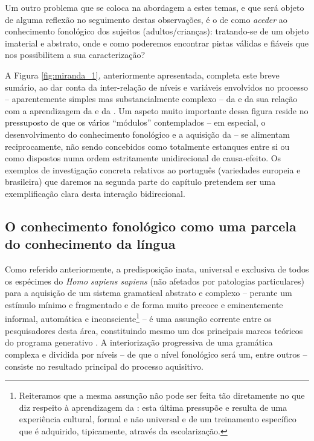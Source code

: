 \documentclass[output=paper]{LSP/langsci}
\begin{document}
Um outro problema que se coloca na abordagem a estes temas, e que será objeto de alguma reflexão no seguimento destas observações, é o de como \textit{aceder} ao conhecimento fonológico dos sujeitos (adultos/crianças): tratando-se de um objeto imaterial e abstrato, onde e como poderemos encontrar pistas válidas e fiáveis que nos possibilitem a sua caracterização?

A Figura \ref{fig:miranda_1}, anteriormente apresentada, completa este breve sumário, ao dar conta da inter-relação de níveis e variáveis envolvidos no processo -- aparentemente simples mas substancialmente complexo -- da  e da sua relação com a aprendizagem da  e da . Um aspeto muito importante dessa figura reside no pressuposto de que os vários ``módulos'' contemplados -- em especial, o desenvolvimento do conhecimento fonológico e a aquisição da  -- se alimentam reciprocamente, não sendo concebidos como totalmente estanques entre si ou como dispostos numa ordem estritamente unidirecional de causa-efeito. Os exemplos de investigação concreta relativos ao português (variedades europeia e brasileira) que daremos na segunda parte do capítulo pretendem ser uma exemplificação clara desta interação bidirecional.

\subsection{O conhecimento fonológico como uma parcela do conhecimento da língua}
\label{subsec:miranda_conhecimento}

Como referido anteriormente, a predisposição inata, universal e exclusiva de todos os espécimes do \textit{Homo sapiens sapiens} (não afetados por patologias particulares) para a aquisição de um sistema gramatical abstrato e complexo -- perante um estímulo mínimo e fragmentado e de forma muito precoce e eminentemente informal, automática e inconsciente\footnote{Reiteramos que a mesma assunção não pode ser feita tão diretamente no que diz respeito à aprendizagem da : esta última pressupõe e resulta de uma experiência cultural, formal e não universal e de um treinamento específico que é adquirido, tipicamente, através da escolarização.} -- é uma assunção corrente entre os pesquisadores desta área, constituindo mesmo um dos principais marcos teóricos do programa generativo \citep{chomsky1965,chomsky1986,chomsky1995}. A interiorização progressiva de uma gramática complexa e dividida por níveis -- de que o nível fonológico será um, entre outros -- consiste no resultado principal do processo aquisitivo.
\end{document}
